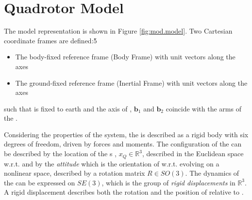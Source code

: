 \section{Quadrotor Model}
The  model representation is shown in Figure \ref{fig:mod.model}. Two Cartesian coordinate frames are defined:\v{5}
\begin{itemize}
	\setlength\itemsep{.2pt}
	\item The body-fixed reference frame  (Body Frame)
	\subitem with unit vectors  along the axes
	\item The ground-fixed reference frame  (Inertial Frame)
	\subitem with unit vectors  along the axes								
\end{itemize}
such that \IF is fixed to earth and the axis of \BF, $ \mathbf{b}_1$ and $\mathbf{b}_2 $ coincide with the arms of the .

Considering the properties of the system, the  is described as a rigid body with six degrees of freedom, driven by forces and moments. 
The configuration of the  can be described by the location of the s , $x_Q\in \mathbb{R}^3 $, described in the Euclidean space w.r.t. \IF and by the \textit{attitude} which is the orientation of \BF w.r.t. \IF evolving on a nonlinear space, described by a rotation matrix $R\in SO(3) $. The dynamics of the  can be expressed on $ SE(3) $, which is the group of \textit{rigid displacements} in $ \mathbb{R}^3 $. A rigid displacement describes both the rotation and the position of \BF relative to \IF. \\

